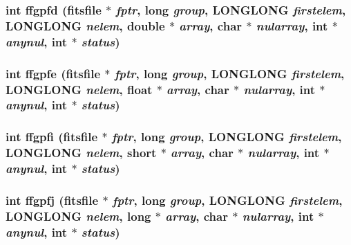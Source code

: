 \subsubsection{\setlength{\rightskip}{0pt plus 5cm}int ffgpfd (\bf{fitsfile} $\ast$ {\em fptr}, long {\em group}, \bf{LONGLONG} {\em firstelem}, \bf{LONGLONG} {\em nelem}, double $\ast$ {\em array}, char $\ast$ {\em nularray}, int $\ast$ {\em anynul}, int $\ast$ {\em status})}\label{test_2roimasker_2fitsio_8h_f07b2a21749be57deb75f5b64431f653}


\subsubsection{\setlength{\rightskip}{0pt plus 5cm}int ffgpfe (\bf{fitsfile} $\ast$ {\em fptr}, long {\em group}, \bf{LONGLONG} {\em firstelem}, \bf{LONGLONG} {\em nelem}, float $\ast$ {\em array}, char $\ast$ {\em nularray}, int $\ast$ {\em anynul}, int $\ast$ {\em status})}\label{test_2roimasker_2fitsio_8h_1a079011790bd529d65496708911d743}


\subsubsection{\setlength{\rightskip}{0pt plus 5cm}int ffgpfi (\bf{fitsfile} $\ast$ {\em fptr}, long {\em group}, \bf{LONGLONG} {\em firstelem}, \bf{LONGLONG} {\em nelem}, short $\ast$ {\em array}, char $\ast$ {\em nularray}, int $\ast$ {\em anynul}, int $\ast$ {\em status})}\label{test_2roimasker_2fitsio_8h_f29072567714e2050dec2f834a1890c8}


\subsubsection{\setlength{\rightskip}{0pt plus 5cm}int ffgpfj (\bf{fitsfile} $\ast$ {\em fptr}, long {\em group}, \bf{LONGLONG} {\em firstelem}, \bf{LONGLONG} {\em nelem}, long $\ast$ {\em array}, char $\ast$ {\em nularray}, int $\ast$ {\em anynul}, int $\ast$ {\em status})}\label{test_2roimasker_2fitsio_8h_348a086c25d23b4b453e20483c0552a2}


